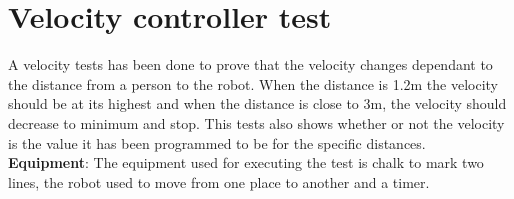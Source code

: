 \section{Velocity controller test}
A velocity tests has been done to prove that the velocity changes dependant to the distance from a person to the robot. When the distance is 1.2m the velocity should be at its highest and when the distance is close to 3m, the velocity should decrease to minimum and stop. This tests also shows whether or not the velocity is the value it has been programmed to be for the specific distances.\\

\textbf{Equipment}: The equipment used for executing the test is chalk to mark two lines, the robot used to move from one place to another and a timer.\\

